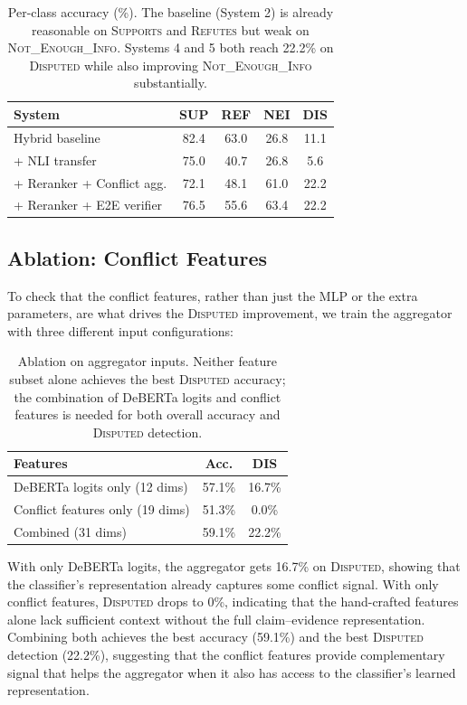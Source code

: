 \documentclass[11pt]{article}
\begin{document}
\begin{table}[t]
\centering
\small
\begin{tabular}{@{}lcccc@{}}
\toprule
\textbf{System} & \textbf{SUP} & \textbf{REF} & \textbf{NEI} & \textbf{DIS} \\
\midrule
Hybrid baseline & 82.4 & 63.0 & 26.8 & 11.1 \\
+ NLI transfer & 75.0 & 40.7 & 26.8 & 5.6 \\
+ Reranker + Conflict agg. & 72.1 & 48.1 & 61.0 & 22.2 \\
+ Reranker + E2E verifier & 76.5 & 55.6 & 63.4 & 22.2 \\
\bottomrule
\end{tabular}
\caption{Per-class accuracy (\%). The baseline (System 2) is already
reasonable on \textsc{Supports} and \textsc{Refutes} but weak on
\textsc{Not\_Enough\_Info}. Systems 4 and 5 both reach 22.2\% on
\textsc{Disputed} while also improving \textsc{Not\_Enough\_Info}
substantially.}
\label{tab:per-class}
\end{table}

\subsection{Ablation: Conflict Features}

To check that the conflict features, rather than just the MLP or the extra
parameters, are what drives the \textsc{Disputed} improvement, we
train the aggregator with three different input configurations:

\begin{table}[h]
\centering
\small
\begin{tabular}{@{}lcc@{}}
\toprule
\textbf{Features} & \textbf{Acc.} & \textbf{DIS} \\
\midrule
DeBERTa logits only (12 dims) & 57.1\% & 16.7\% \\
Conflict features only (19 dims) & 51.3\% & 0.0\% \\
Combined (31 dims) & 59.1\% & 22.2\% \\
\bottomrule
\end{tabular}
\caption{Ablation on aggregator inputs. Neither feature subset alone
achieves the best \textsc{Disputed} accuracy; the combination of
DeBERTa logits and conflict features is needed for both overall
accuracy and \textsc{Disputed} detection.}
\label{tab:ablation}
\end{table}

With only DeBERTa logits, the aggregator gets 16.7\% on \textsc{Disputed},
showing that the classifier's representation already captures some
conflict signal.
With only conflict features, \textsc{Disputed} drops to 0\%, indicating
that the hand-crafted features alone lack sufficient context without
the full claim--evidence representation.
Combining both achieves the best accuracy (59.1\%) and the best
\textsc{Disputed} detection (22.2\%), suggesting that the conflict
features provide complementary signal that helps the aggregator
when it also has access to the classifier's learned representation.
\end{document}
